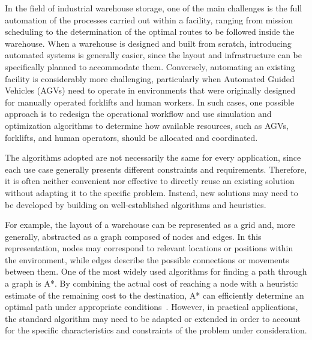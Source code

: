 In the field of industrial warehouse storage, one of the main challenges is the full automation of the processes carried out within a facility, ranging from mission scheduling to the determination of the optimal routes to be followed inside the warehouse. When a warehouse is designed and built from scratch, introducing automated systems is generally easier, since the layout and infrastructure can be specifically planned to accommodate them. Conversely, automating an existing facility is considerably more challenging, particularly when Automated Guided Vehicles (AGVs) need to operate in environments that were originally designed for manually operated forklifts and human workers. In such cases, one possible approach is to redesign the operational workflow and use simulation and optimization algorithms to determine how available resources, such as AGVs, forklifts, and human operators, should be allocated and coordinated.

The algorithms adopted are not necessarily the same for every application, since each use case generally presents different constraints and requirements. Therefore, it is often neither convenient nor effective to directly reuse an existing solution without adapting it to the specific problem. Instead, new solutions may need to be developed by building on well-established algorithms and heuristics.

For example, the layout of a warehouse can be represented as a grid and, more generally, abstracted as a graph composed of nodes and edges. In this representation, nodes may correspond to relevant locations or positions within the environment, while edges describe the possible connections or movements between them. One of the most widely used algorithms for finding a path through a graph is A*. By combining the actual cost of reaching a node with a heuristic estimate of the remaining cost to the destination, A* can efficiently determine an optimal path under appropriate conditions~\cite{hart1968formal}. However, in practical applications, the standard algorithm may need to be adapted or extended in order to account for the specific characteristics and constraints of the problem under consideration.


